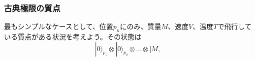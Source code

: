 \subsubsection{古典極限の質点}
最もシンプルなケースとして、位置$p_n$にのみ、質量$M$、速度$V$、温度$T$で飛行している質点がある状況を考えよう。その状態は
\begin{equation}
    |0\rangle_{p_1} \otimes |0\rangle_{p_2} \otimes \dots \otimes |M,
\end{equation}
